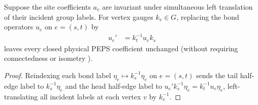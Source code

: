 \begin{lemma}%
    \label{thm:peps_regular_closed_gauge}
    \leanok
    Suppose the site coefficients $a_v$ are invariant under simultaneous left translation of their incident group labels. For vertex gauges $k_v\in G$, replacing the bond operators $u_e$ on $e=(s,t)$ by
    \begin{align}
        u_e' & = k_t^{-1}u_e k_s
        \label{eq:peps_regular_closed_gauge}
    \end{align}
    leaves every closed physical PEPS coefficient unchanged (without requiring connectedness or isometry \cite[\S5.3]{Schuch2010PEPS}).
\end{lemma}

\begin{proof}\leanok
    Reindexing each bond label $\eta_e\mapsto k_s^{-1}\eta_e$ on $e=(s,t)$ sends the tail half-edge label to $k_s^{-1}\eta_e$ and the head half-edge label to $u_e'k_s^{-1}\eta_e=k_t^{-1}u_e\eta_e$, left-translating all incident labels at each vertex $v$ by $k_v^{-1}$.
\end{proof}


